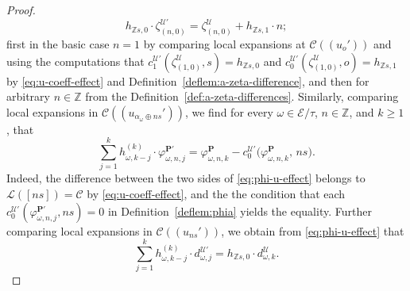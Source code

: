 \documentclass[preprint,12pt]{elsarticle}
\numberwithin{equation}{section} %
\theoremstyle{theorem}
\theoremstyle{definition}
\newcommand{\Ca}{\mathcal{C}} %
\newcommand{\ec}{\mathcal{E}} %
\newcommand{\idec}{{o}} %
\newcommand{\orbita}{{\ec/\tau}} %
\newcommand{\Z}{\mathbb{Z}} %
\newcommand{\za}[2]{\zeta^{\mathcal{U}}_{( {#1} , {#2} )}}
\begin{document}
\begin{proof}
 \begin{equation}\label{eq:zeta-u-effect}
        h_{\Z s,0}\cdot\zeta^{\mathcal{U}'}_{(n,0)}=\za{n}{0}+h_{\Z s,1}\cdot n;
    \end{equation}
    first in the basic case $n=1$ by comparing local expansions at $\Ca ((u_\idec'))$ and using the computations that $c_1^{\mathcal{U}'}(\za{1}{0},s)=h_{\Z s,0}$ and $c_0^{\mathcal{U}'}(\za{1}{0},\idec)=h_{\Z s,1}$ by \eqref{eq:u-coeff-effect} and Definition~\ref{deflem:a-zeta-difference}, and then for arbitrary $n\in\Z$ from the Definition~\ref{def:a-zeta-differences}. Similarly, comparing local expansions in $\Ca((u_{\alpha_\omega\oplus ns}'))$, we find for every $\omega\in\orbita$, $n\in\Z$, and $k\geq 1$, that
    \begin{equation}\label{eq:phi-u-effect}
        \sum_{j=1}^k h^{(k)}_{\omega,k-j}\cdot\varphi^{\mathbf{P}'}_{\omega,n,j}=\varphi^\mathbf{P}_{\omega,n,k}-c^{\mathcal{U}'}_0\bigl(\varphi^\mathbf{P}_{\omega,n,k},\,ns\bigr).
    \end{equation} Indeed, the difference between the two sides of \eqref{eq:phi-u-effect} belongs to $\mathcal{L}([ns])=\Ca$ by \eqref{eq:u-coeff-effect}, and the the condition that each $c^{\mathcal{U}'}_0(\varphi^{\mathbf{P}'}_{\omega,n,j},ns)=0$ in Definition~\ref{deflem:phia} yields the equality.
    Further comparing local expansions in $\Ca((u_{ns}'))$, we obtain from \eqref{eq:phi-u-effect} that \begin{equation}\label{eq:d-u-effect}
    \sum_{j=1}^k h^{(k)}_{\omega,k-j}\cdot d^{\mathcal{U}'}_{\omega,j}=h_{\Z s,0}\cdot d^\mathcal{U}_{\omega,k}.
    \end{equation} 



\end{proof}
\end{document}

